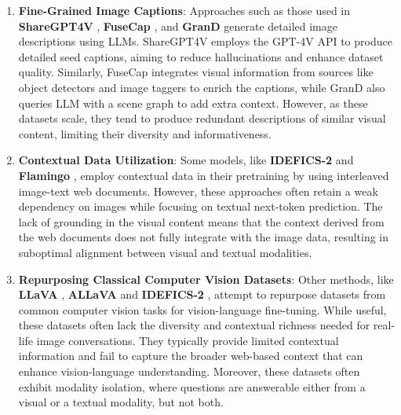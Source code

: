 \begin{enumerate}
    \item \textbf{Fine-Grained Image Captions}: Approaches such as those used in \textbf{ShareGPT4V} \citep{chen2023sharegpt4v}, \textbf{FuseCap} \citep{rotstein2023fusecap}, and \textbf{GranD} \citep{rasheed2024glamm} generate detailed image descriptions using LLMs. ShareGPT4V employs the GPT-4V API to produce detailed seed captions, aiming to reduce hallucinations and enhance dataset quality. Similarly, FuseCap integrates visual information from sources like object detectors and image taggers to enrich the captions, while GranD also queries LLM with a scene graph to add extra context. However, as these datasets scale, they tend to produce redundant descriptions of similar visual content, limiting their diversity and informativeness.
    \item \textbf{Contextual Data Utilization}: Some models, like \textbf{IDEFICS-2} \citep{laurenccon2024matters} and \textbf{Flamingo} \citep{alayrac2022flamingo}, employ contextual data in their pretraining by using interleaved image-text web documents. However, these approaches often retain a weak dependency on images while focusing on textual next-token prediction. The lack of grounding in the visual content means that the context derived from the web documents does not fully integrate with the image data, resulting in suboptimal alignment between visual and textual modalities.
    \item \textbf{Repurposing Classical Computer Vision Datasets}: Other methods, like \textbf{LLaVA} \citep{liu2024visual}, \textbf{ALLaVA} \citep{chen2024allava} and \textbf{IDEFICS-2} \citep{laurenccon2024matters}, attempt to repurpose datasets from common computer vision tasks for vision-language fine-tuning. While useful, these datasets often lack the diversity and contextual richness needed for real-life image conversations. They typically provide limited contextual information and fail to capture the broader web-based context that can enhance vision-language understanding. Moreover, these datasets often exhibit modality isolation, where questions are answerable either from a visual or a textual modality, but not both.


\end{enumerate}
